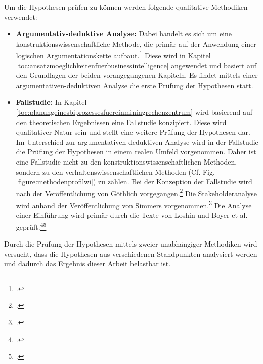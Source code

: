 Um die Hypothesen prüfen zu können werden folgende qualitative Methodiken verwendet: 

\begin{itemize}
    \item \textbf{Argumentativ-deduktive Analyse: }Dabei handelt es sich um eine konstruktionswissenschaftliche Methode, die primär auf
    der Anwendung einer logischen Argumentationskette aufbaut.\footcite[Cf.][Tbl. 1]{wilde2007forschungsmethoden} Diese wird in Kapitel
    \ref{toc:ansatzmoeglichkeitenfuerbusinessintelligence} angewendet und basiert auf den Grundlagen der beiden vorangegangenen Kapiteln.
    Es findet mittels einer argumentativen-deduktiven Analyse die erste Prüfung der Hypothesen statt. 
    \item \textbf{Fallstudie: }In Kapitel \ref{toc:planungeinesbiprozessesfuereinminingrechenzentrum} wird basierend auf den theoretischen
    Ergebnissen eine Fallstudie konzipiert. Diese wird qualitativer Natur sein und stellt eine weitere Prüfung der Hypothesen dar. Im
    Unterschied zur argumentativen-deduktiven Analyse wird in der Fallstudie die Prüfung der Hypothesen in einem realen Umfeld vorgenommen.
    Daher ist eine Fallstudie nicht zu den konstruktionswissenschaftlichen Methoden, sondern zu den verhaltenswissenschaftlichen Methoden
    (Cf. Fig. \ref{figure:methodenprofilwi}) zu zählen. Bei der Konzeption der Fallstudie wird nach der Veröffentlichung von Göthlich
    vorgegangen.\footcite[Cf.][]{gothlich2003fallstudien} Die Stakeholderanalyse wird anhand der Veröffentlichung von Simmers
    vorgenommen.\footcite[Cf.][]{simmers2004stakeholder} Die Analyse einer Einführung wird primär durch die Texte von Loshin und
    Boyer et al. geprüft.\footcite[Cf.][]{loshin2012business}\footcite[Cf.][]{boyer2010business}
\end{itemize} 

Durch die Prüfung der Hypothesen mittels zweier unabhängiger Methodiken wird versucht, dass die Hypothesen aus verschiedenen Standpunkten analysiert
werden und dadurch das Ergebnis dieser Arbeit belastbar ist.